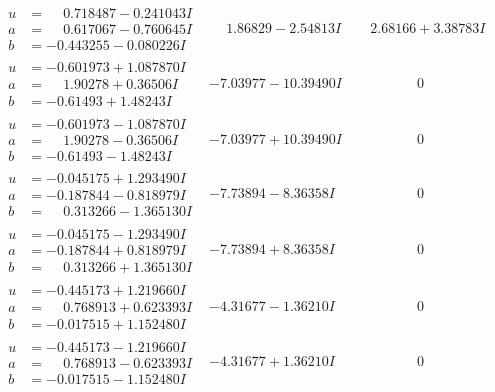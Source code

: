 \documentclass[1p]{elsarticle_modified}
\theoremstyle{definition}
\begin{document}
$$\begin{array}{c|c|c}
\begin{aligned}
u &= \phantom{-}0.718487 - 0.241043 I \\
a &= \phantom{-}0.617067 - 0.760645 I \\
b &= -0.443255 - 0.080226 I\end{aligned}
 & \phantom{-}1.86829 - 2.54813 I & \phantom{-}2.68166 + 3.38783 I \\ \hline\begin{aligned}
u &= -0.601973 + 1.087870 I \\
a &= \phantom{-}1.90278 + 0.36506 I \\
b &= -0.61493 + 1.48243 I\end{aligned}
 & -7.03977 - 10.39490 I & \phantom{-0.000000 } 0 \\ \hline\begin{aligned}
u &= -0.601973 - 1.087870 I \\
a &= \phantom{-}1.90278 - 0.36506 I \\
b &= -0.61493 - 1.48243 I\end{aligned}
 & -7.03977 + 10.39490 I & \phantom{-0.000000 } 0 \\ \hline\begin{aligned}
u &= -0.045175 + 1.293490 I \\
a &= -0.187844 - 0.818979 I \\
b &= \phantom{-}0.313266 - 1.365130 I\end{aligned}
 & -7.73894 - 8.36358 I & \phantom{-0.000000 } 0 \\ \hline\begin{aligned}
u &= -0.045175 - 1.293490 I \\
a &= -0.187844 + 0.818979 I \\
b &= \phantom{-}0.313266 + 1.365130 I\end{aligned}
 & -7.73894 + 8.36358 I & \phantom{-0.000000 } 0 \\ \hline\begin{aligned}
u &= -0.445173 + 1.219660 I \\
a &= \phantom{-}0.768913 + 0.623393 I \\
b &= -0.017515 + 1.152480 I\end{aligned}
 & -4.31677 - 1.36210 I & \phantom{-0.000000 } 0 \\ \hline\begin{aligned}
u &= -0.445173 - 1.219660 I \\
a &= \phantom{-}0.768913 - 0.623393 I \\
b &= -0.017515 - 1.152480 I\end{aligned}
 & -4.31677 + 1.36210 I & \phantom{-0.000000 } 0 \\ \hline\begin{aligned}

\end{aligned}
\end{array}$$
\end{document}
